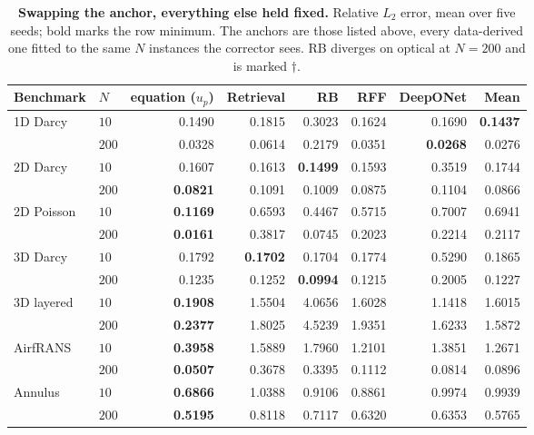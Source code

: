 \documentclass{article}
\begin{document}
\begin{table}[t]
    \centering
    \footnotesize
    \caption{\textbf{Swapping the anchor, everything else held fixed.} Relative $L_2$ error,
    mean over five seeds; bold marks the row minimum. The anchors are those listed above, every
    data-derived one fitted to the same $N$ instances the corrector sees. RB diverges on optical at
    $N{=}200$ and is marked $\dagger$.}
    \label{tab:anchor-equal}
    \setlength{\tabcolsep}{6pt}
    \renewcommand{\arraystretch}{0.7}
    \begin{tabular}{@{}llrrrrrr@{}}
        \toprule
        Benchmark & $N$ & equation ($u_p$) & Retrieval & RB & RFF & DeepONet & Mean \\
        \midrule
        1D Darcy & $10$ & 0.1490 & 0.1815 & 0.3023 & 0.1624 & 0.1690 & \textbf{0.1437} \\
         & $200$ & 0.0328 & 0.0614 & 0.2179 & 0.0351 & \textbf{0.0268} & 0.0276 \\
        \addlinespace[2pt]
        2D Darcy & $10$ & 0.1607 & 0.1613 & \textbf{0.1499} & 0.1593 & 0.3519 & 0.1744 \\
         & $200$ & \textbf{0.0821} & 0.1091 & 0.1009 & 0.0875 & 0.1104 & 0.0866 \\
        \addlinespace[2pt]
        2D Poisson & $10$ & \textbf{0.1169} & 0.6593 & 0.4467 & 0.5715 & 0.7007 & 0.6941 \\
         & $200$ & \textbf{0.0161} & 0.3817 & 0.0745 & 0.2023 & 0.2214 & 0.2117 \\
        \addlinespace[2pt]
        3D Darcy & $10$ & 0.1792 & \textbf{0.1702} & 0.1704 & 0.1774 & 0.5290 & 0.1865 \\
         & $200$ & 0.1235 & 0.1252 & \textbf{0.0994} & 0.1215 & 0.2005 & 0.1227 \\
        \addlinespace[2pt]
        3D layered & $10$ & \textbf{0.1908} & 1.5504 & 4.0656 & 1.6028 & 1.1418 & 1.6015 \\
         & $200$ & \textbf{0.2377} & 1.8025 & 4.5239 & 1.9351 & 1.6233 & 1.5872 \\
        \addlinespace[2pt]
        AirfRANS & $10$ & \textbf{0.3958} & 1.5889 & 1.7960 & 1.2101 & 1.3851 & 1.2671 \\
         & $200$ & \textbf{0.0507} & 0.3678 & 0.3395 & 0.1112 & 0.0814 & 0.0896 \\
        \addlinespace[2pt]
        Annulus & $10$ & \textbf{0.6866} & 1.0388 & 0.9106 & 0.8861 & 0.9974 & 0.9939 \\
         & $200$ & \textbf{0.5195} & 0.8118 & 0.7117 & 0.6320 & 0.6353 & 0.5765 \\

\end{tabular}
\end{table}
\end{document}
